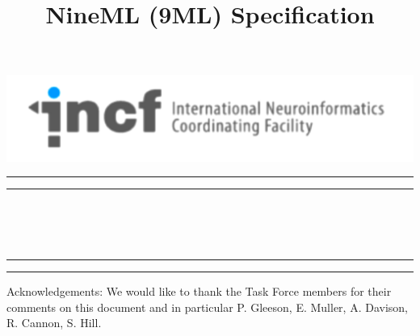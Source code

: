 \documentclass{article}
\begin{document}
\pagestyle{empty}

\begin{center}
{\includegraphics[width=0.7\columnwidth]{images/incf.png}}
\end{center}

\vspace*{1cm}

\noindent\rule{\columnwidth}{1pt}
\noindent\rule{\columnwidth}{2pt}

\vspace*{1cm}

\begin{center}
\\
\vspace{0.5cm}
\\
\vspace{0.5cm}
\\
\vspace{0.5cm}
\end{center}

\vspace*{0.75cm}

\noindent\rule{\columnwidth}{2pt}
\noindent\rule{\columnwidth}{1pt}

\vspace*{3cm}

Acknowledgements: We would like to thank the Task Force members for their comments on this document and in particular P. Gleeson, E. Muller, A. Davison, R. Cannon, S. Hill.


\title{NineML (9ML) Specification}
\end{document}
